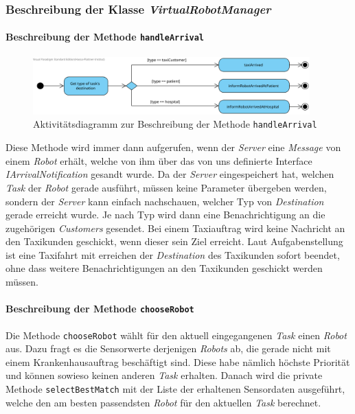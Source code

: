 	\subsubsection{Beschreibung der Klasse \textit{VirtualRobotManager}}
			\paragraph{Beschreibung der Methode \texttt{handleArrival}}
			\begin{figure}[H]
			\centering
			\includegraphics[width=0.95\textwidth]{img/HandleArrival}
			\caption{Aktivitätsdiagramm zur Beschreibung der Methode \texttt{handleArrival}}
			\label{SequenzQueuePoll}
			\end{figure}	
			Diese Methode wird immer dann aufgerufen, wenn der \textit{Server} eine \textit{Message} von einem \textit{Robot} erhält, welche von ihm über das von uns definierte Interface \textit{IArrivalNotification} gesandt wurde. Da der \textit{Server} eingespeichert hat, welchen \textit{Task} der \textit{Robot} gerade ausführt, müssen keine Parameter übergeben werden, sondern der \textit{Server} kann einfach nachschauen, welcher Typ von \textit{Destination} gerade erreicht wurde. Je nach Typ wird dann eine Benachrichtigung an die zugehörigen \textit{Customers} gesendet. Bei einem Taxiauftrag wird keine Nachricht an den Taxikunden geschickt, wenn dieser sein Ziel erreicht. Laut Aufgabenstellung ist eine Taxifahrt mit erreichen der \textit{Destination} des Taxikunden sofort beendet, ohne dass weitere Benachrichtigungen an den Taxikunden geschickt werden müssen.
			
			
			\paragraph{Beschreibung der Methode \texttt{chooseRobot}}
			Die Methode \texttt{chooseRobot} wählt für den aktuell eingegangenen \emph{Task} einen \emph{Robot} aus. 
			Dazu fragt es die Sensorwerte derjenigen \textit{Robots} ab, die gerade nicht mit einem Krankenhausauftrag beschäftigt sind. Diese habe nämlich höchste Priorität und können sowieso keinen anderen \textit{Task} erhalten. Danach wird die private Methode \texttt{selectBestMatch} mit der Liste der erhaltenen Sensordaten ausgeführt, welche den am besten passendsten \textit{Robot} für den aktuellen \textit{Task} berechnet.
				
